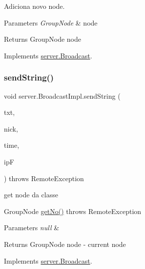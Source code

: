Adiciona novo node. 


\begin{DoxyParams}{Parameters}
{\em Group\+Node} & node \\
\hline
\end{DoxyParams}
\begin{DoxyReturn}{Returns}
Group\+Node node 
\end{DoxyReturn}


Implements \hyperlink{interfaceserver_1_1_broadcast_aac507ae95810ae722d7d204e5f0b5762}{server.\+Broadcast}.

\mbox{\label{classserver_1_1_broadcast_impl_a5abfc6721496474d39d6b2b31589d11b}} 
\subsubsection{\texorpdfstring{send\+String()}{sendString()}}
{\footnotesize\ttfamily void server.\+Broadcast\+Impl.\+send\+String (\begin{DoxyParamCaption}\item[{String}]{txt,  }\item[{String}]{nick,  }\item[{Local\+Time}]{time,  }\item[{String}]{ipF }\end{DoxyParamCaption}) throws Remote\+Exception}



get node da classe 

Group\+Node \hyperlink{classserver_1_1_broadcast_impl_a7e004ba2fd22f9225c278f1b5bbe4dbb}{get\+No()} throws Remote\+Exception 
\begin{DoxyParams}{Parameters}
{\em null} & \\
\hline
\end{DoxyParams}
\begin{DoxyReturn}{Returns}
Group\+Node node -\/ current node 
\end{DoxyReturn}


Implements \hyperlink{interfaceserver_1_1_broadcast_aaad069086f243e7b256e732a65f78763}{server.\+Broadcast}.

\mbox{\label{classserver_1_1_broadcast_impl_a264c486f39faa2ab66a7d5a2a0c245b1}} 
